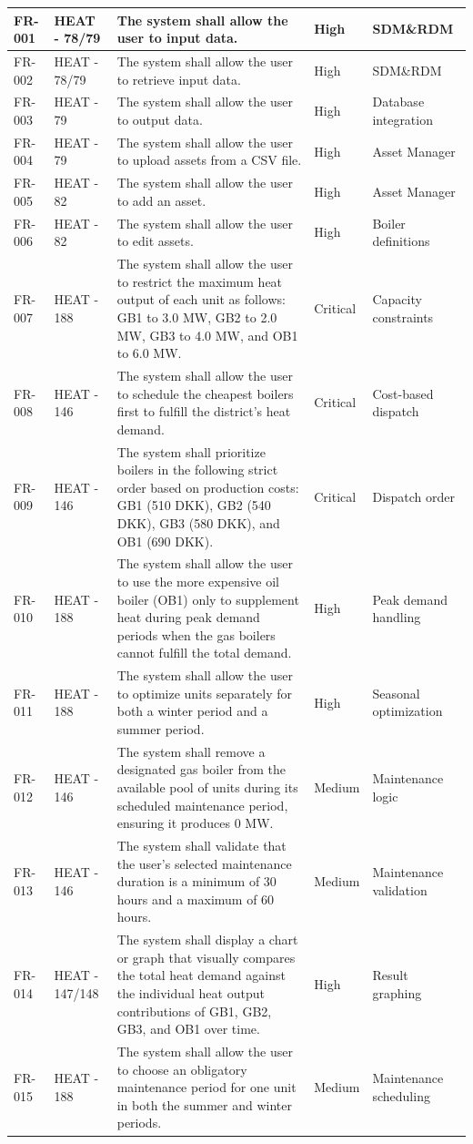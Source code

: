 \begin{longtable}{|p{1.5cm}|p{2.4cm}|p{6.7cm}|p{1.4cm}|p{2cm}|}
FR-001 & HEAT - 78/79 & The system shall allow the user to input data. & High & SDM\&RDM \\
\hline
FR-002 & HEAT - 78/79 & The system shall allow the user to retrieve input data. & High & SDM\&RDM \\
\hline
FR-003 & HEAT - 79 & The system shall allow the user to output data. & High & Database integration \\
\hline
FR-004 & HEAT - 79 & The system shall allow the user to upload assets from a CSV file. & High & Asset Manager \\
\hline
FR-005 & HEAT - 82 & The system shall allow the user to add an asset. & High & Asset Manager \\
\hline
FR-006 & HEAT - 82 & The system shall allow the user to edit assets. & High & Boiler definitions \\
\hline
FR-007 & HEAT - 188 & The system shall allow the user to restrict the maximum heat output of each unit as follows: GB1 to 3.0 MW, GB2 to 2.0 MW, GB3 to 4.0 MW, and OB1 to 6.0 MW. & Critical & Capacity constraints \\
\hline
FR-008 & HEAT - 146 & The system shall allow the user to schedule the cheapest boilers first to fulfill the district’s heat demand. & Critical & Cost-based dispatch \\
\hline
FR-009 & HEAT - 146 & The system shall prioritize boilers in the following strict order based on production costs: GB1 (510 DKK), GB2 (540 DKK), GB3 (580 DKK), and OB1 (690 DKK). & Critical & Dispatch order \\
\hline
FR-010 & HEAT - 188 & The system shall allow the user to use the more expensive oil boiler (OB1) only to supplement heat during peak demand periods when the gas boilers cannot fulfill the total demand. & High & Peak demand handling \\
\hline
FR-011 & HEAT - 188 & The system shall allow the user to optimize units separately for both a winter period and a summer period. & High & Seasonal optimization \\
\hline
FR-012 & HEAT - 146 & The system shall remove a designated gas boiler from the available pool of units during its scheduled maintenance period, ensuring it produces 0 MW. & Medium & Maintenance logic \\
\hline
FR-013 & HEAT - 146 & The system shall validate that the user’s selected maintenance duration is a minimum of 30 hours and a maximum of 60 hours. & Medium & Maintenance validation \\
\hline
FR-014 & HEAT - 147/148 & The system shall display a chart or graph that visually compares the total heat demand against the individual heat output contributions of GB1, GB2, GB3, and OB1 over time. & High & Result graphing \\
\hline
FR-015 & HEAT - 188 & The system shall allow the user to choose an obligatory maintenance period for one unit in both the summer and winter periods. & Medium & Maintenance scheduling \\
\end{longtable}


